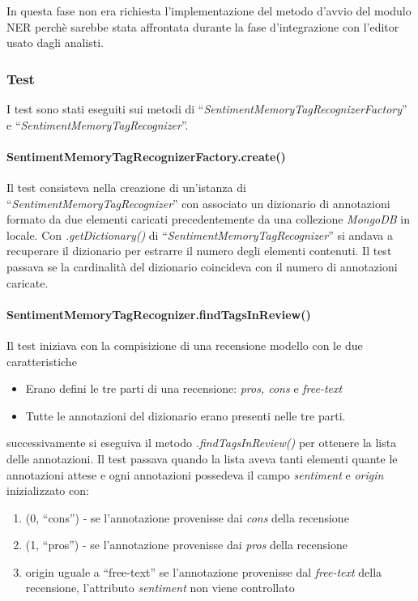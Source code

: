In questa fase non era richiesta l'implementazione del metodo d'avvio del modulo
\gls{NER} perchè sarebbe stata affrontata durante la fase d'integrazione con
l'editor usato dagli analisti.

\subsubsection{Test}
I test sono stati eseguiti sui metodi di
``\textit{SentimentMemoryTagRecognizerFactory}'' e
``\textit{SentimentMemoryTagRecognizer}''.

\paragraph{SentimentMemoryTagRecognizerFactory.create()}
Il test consisteva nella creazione di un'istanza di
``\textit{SentimentMemoryTagRecognizer}'' con associato un dizionario di
annotazioni formato da due elementi caricati precedentemente da una collezione
\textit{MongoDB} in locale. Con \textit{.getDictionary()} di
``\textit{SentimentMemoryTagRecognizer}'' si andava a recuperare il dizionario
per estrarre il numero degli elementi contenuti. Il test passava se la
cardinalità del dizionario coincideva con il numero di annotazioni caricate.

\paragraph{SentimentMemoryTagRecognizer.findTagsInReview()}
Il test iniziava con la compisizione di una recensione modello con le due
caratteristiche
\begin{itemize}
\item Erano defini le tre parti di una recensione: \textit{pros, cons} e
\textit{free-text}
\item Tutte le annotazioni del dizionario erano presenti nelle tre parti.
\end{itemize}
successivamente si eseguiva il metodo \textit{.findTagsInReview()} per ottenere
la lista delle annotazioni. Il test passava quando la lista aveva tanti elementi
quante le annotazioni attese e ogni annotazioni possedeva il campo
\textit{sentiment} e \textit{origin} inizializzato con:
\begin{enumerate}
\item (0, ``cons'') - se l'annotazione provenisse dai \textit{cons} della
recensione
\item (1, ``pros'') - se l'annotazione provenisse dai \textit{pros} della
recensione
\item origin uguale a ``free-text'' se l'annotazione provenisse dal
\textit{free-text} della recensione, l'attributo \textit{sentiment} non viene
controllato
\end{enumerate}

